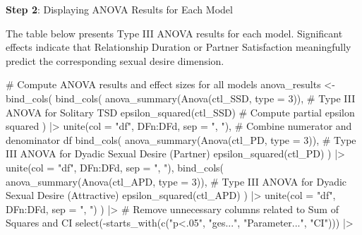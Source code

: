 \documentclass[
  bookmarksnumbered]{article}
\newenvironment{Shaded}{\begin{snugshade}}{\end{snugshade}}
\newcommand{\AttributeTok}[1]{\textcolor[rgb]{0.80,0.80,0.80}{#1}}
\newcommand{\CommentTok}[1]{\textcolor[rgb]{0.50,0.62,0.50}{#1}}
\newcommand{\DecValTok}[1]{\textcolor[rgb]{0.86,0.86,0.80}{#1}}
\newcommand{\FunctionTok}[1]{\textcolor[rgb]{0.94,0.94,0.56}{#1}}
\newcommand{\NormalTok}[1]{\textcolor[rgb]{0.80,0.80,0.80}{#1}}
\newcommand{\OtherTok}[1]{\textcolor[rgb]{0.94,0.94,0.56}{#1}}
\newcommand{\SpecialCharTok}[1]{\textcolor[rgb]{0.86,0.64,0.64}{#1}}
\newcommand{\StringTok}[1]{\textcolor[rgb]{0.80,0.58,0.58}{#1}}
\begin{document}
\textbf{Step 2}: Displaying ANOVA Results for Each Model

The table below presents Type III ANOVA results for each model. Significant effects indicate that Relationship Duration or Partner Satisfaction meaningfully predict the corresponding sexual desire dimension.

\begin{Shaded}
\begin{Highlighting}[]
\CommentTok{\# Compute ANOVA results and effect sizes for all models}
\NormalTok{anova\_results }\OtherTok{\textless{}{-}} \FunctionTok{bind\_cols}\NormalTok{(}
  \FunctionTok{bind\_cols}\NormalTok{(}
    \FunctionTok{anova\_summary}\NormalTok{(}\FunctionTok{Anova}\NormalTok{(ctl\_SSD, }\AttributeTok{type =} \DecValTok{3}\NormalTok{)), }\CommentTok{\# Type III ANOVA for Solitary TSD}
    \FunctionTok{epsilon\_squared}\NormalTok{(ctl\_SSD) }\CommentTok{\# Compute partial epsilon squared}
\NormalTok{  ) }\SpecialCharTok{|\textgreater{}}
    \FunctionTok{unite}\NormalTok{(}\AttributeTok{col =} \StringTok{"df"}\NormalTok{, DFn}\SpecialCharTok{:}\NormalTok{DFd, }\AttributeTok{sep =} \StringTok{", "}\NormalTok{), }\CommentTok{\# Combine numerator and denominator df}
  \FunctionTok{bind\_cols}\NormalTok{(}
    \FunctionTok{anova\_summary}\NormalTok{(}\FunctionTok{Anova}\NormalTok{(ctl\_PD, }\AttributeTok{type =} \DecValTok{3}\NormalTok{)), }\CommentTok{\# Type III ANOVA for Dyadic Sexual Desire (Partner)}
    \FunctionTok{epsilon\_squared}\NormalTok{(ctl\_PD)}
\NormalTok{  ) }\SpecialCharTok{|\textgreater{}}
    \FunctionTok{unite}\NormalTok{(}\AttributeTok{col =} \StringTok{"df"}\NormalTok{, DFn}\SpecialCharTok{:}\NormalTok{DFd, }\AttributeTok{sep =} \StringTok{", "}\NormalTok{),}
  \FunctionTok{bind\_cols}\NormalTok{(}
    \FunctionTok{anova\_summary}\NormalTok{(}\FunctionTok{Anova}\NormalTok{(ctl\_APD, }\AttributeTok{type =} \DecValTok{3}\NormalTok{)), }\CommentTok{\# Type III ANOVA for Dyadic Sexual Desire (Attractive)}
    \FunctionTok{epsilon\_squared}\NormalTok{(ctl\_APD)}
\NormalTok{  ) }\SpecialCharTok{|\textgreater{}}
    \FunctionTok{unite}\NormalTok{(}\AttributeTok{col =} \StringTok{"df"}\NormalTok{, DFn}\SpecialCharTok{:}\NormalTok{DFd, }\AttributeTok{sep =} \StringTok{", "}\NormalTok{)}
\NormalTok{) }\SpecialCharTok{|\textgreater{}}
  \CommentTok{\# Remove unnecessary columns related to Sum of Squares and CI}
  \FunctionTok{select}\NormalTok{(}\SpecialCharTok{{-}}\FunctionTok{starts\_with}\NormalTok{(}\FunctionTok{c}\NormalTok{(}\StringTok{"p\textless{}.05"}\NormalTok{, }\StringTok{"ges..."}\NormalTok{, }\StringTok{"Parameter..."}\NormalTok{, }\StringTok{"CI"}\NormalTok{))) }\SpecialCharTok{|\textgreater{}}

\end{Highlighting}
\end{Shaded}
\end{document}

